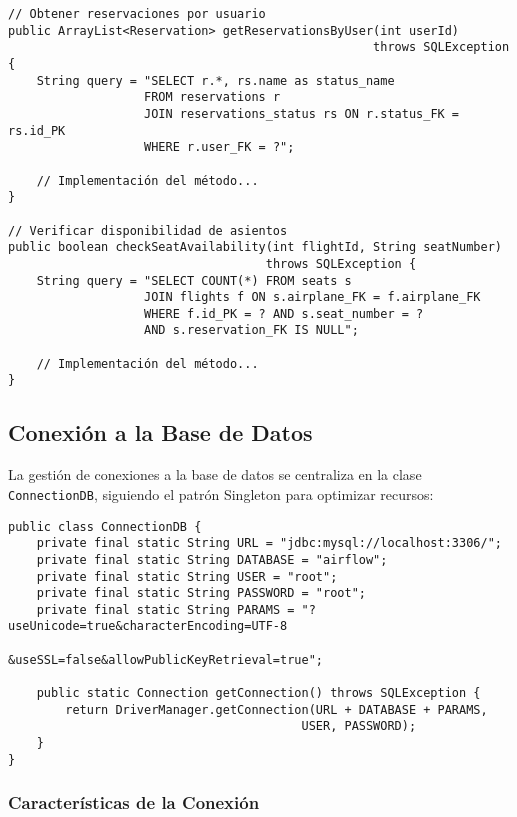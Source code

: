 \documentclass[12pt,a4paper]{article}
\begin{document}
\begin{verbatim}
// Obtener reservaciones por usuario
public ArrayList<Reservation> getReservationsByUser(int userId)
                                                   throws SQLException {
    String query = "SELECT r.*, rs.name as status_name
                   FROM reservations r
                   JOIN reservations_status rs ON r.status_FK = rs.id_PK
                   WHERE r.user_FK = ?";

    // Implementación del método...
}

// Verificar disponibilidad de asientos
public boolean checkSeatAvailability(int flightId, String seatNumber)
                                    throws SQLException {
    String query = "SELECT COUNT(*) FROM seats s
                   JOIN flights f ON s.airplane_FK = f.airplane_FK
                   WHERE f.id_PK = ? AND s.seat_number = ?
                   AND s.reservation_FK IS NULL";

    // Implementación del método...
}
\end{verbatim}

\subsection{Conexión a la Base de Datos}

La gestión de conexiones a la base de datos se centraliza en la clase \texttt{ConnectionDB}, siguiendo el patrón Singleton para optimizar recursos:

\begin{verbatim}
public class ConnectionDB {
    private final static String URL = "jdbc:mysql://localhost:3306/";
    private final static String DATABASE = "airflow";
    private final static String USER = "root";
    private final static String PASSWORD = "root";
    private final static String PARAMS = "?useUnicode=true&characterEncoding=UTF-8
                                        &useSSL=false&allowPublicKeyRetrieval=true";

    public static Connection getConnection() throws SQLException {
        return DriverManager.getConnection(URL + DATABASE + PARAMS,
                                         USER, PASSWORD);
    }
}
\end{verbatim}

\subsubsection{Características de la Conexión}
\end{document}
